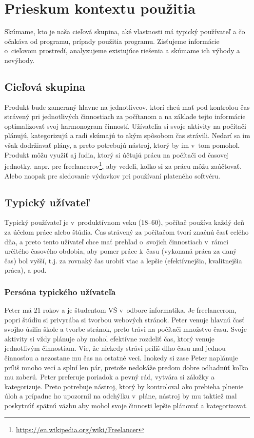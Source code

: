 \documentclass[]{article}
\begin{document}
\newpage

\section{Prieskum kontextu použitia}

Skúmame, kto je naša cieľová skupina, aké vlastnosti má typický používateľ a čo očakáva od programu, prípady použitia programu. Zisťujeme informácie o~cieľovom prostredí, analyzujeme existujúce riešenia a skúmame ich výhody a nevýhody.

\subsection{Cieľová skupina}
Produkt bude zameraný hlavne na jednotlivcov, ktorí chcú mať pod kontrolou čas strávený pri jednotlivých činnostiach za počítanom a na základe tejto informácie optimalizovať svoj harmonogram činností. Užívatelia si svoje aktivity na počítači plánujú, kategorizujú a radi skúmajú to akým spôsobom čas strávili. Nedarí sa im však dodržiavať plány, a preto potrebujú nástroj, ktorý by im v~tom pomohol. Produkt môžu využiť aj ľudia, ktorý si účtujú prácu na počítači od časovej jednotky, napr. pre freelancerov\footnote{\url{https://en.wikipedia.org/wiki/Freelancer}}, aby vedeli, koľko si za prácu môžu zaúčtovať. Alebo naopak pre sledovanie výdavkov pri používaní plateného softvéru.	 


\subsection{Typický užívateľ}
Typický používateľ je v~produktívnom veku (18--60), počítač používa každý deň za účelom práce alebo štúdia. Čas strávený za počítačom tvorí značnú časť celého dňa, a preto tento užívateľ chce mať prehľad o~svojich činnostiach v~rámci určitého časového obdobia, aby pomer práce k~času (vykonaná práca za daný čas) bol vyšší, t.j. za rovnaký čas urobiť viac a lepšie (efektívnejšia, kvalitnejšia práca), a pod.

\newpage

\subsubsection{Persóna typického užívateľa}
Peter má 21 rokov a je študentom VŠ v~odbore informatika. Je freelancerom, popri štúdiu si privyrába si tvorbou webových stránok. Peter venuje hlavnú časť svojho úsilia škole a tvorbe stránok, preto trávi na počítači množstvo času. Svoje aktivity si vždy plánuje aby mohol efektívne rozdeliť čas, ktorý venuje jednotlivým činnostiam. Vie, že niekedy strávi príliš dlho času nad jednou činnosťou a nezostane mu čas na ostatné veci. Inokedy si zase Peter naplánuje príliš mnoho vecí a splní len pár, pretože nedokáže predom dobre odhadnúť koľko mu zaberú. Peter preferuje poriadok a pevný rád, vytvára si záložky a kategorizuje. Preto potrebuje nástroj, ktorý by kontroloval ako prebieha plnenie úloh a prípadne ho upozornil na odchýlku v~pláne, nástroj by mu taktiež mal poskytnúť spätnú väzbu aby mohol svoje činnosti lepšie plánovať a kategorizovať.
\end{document}

